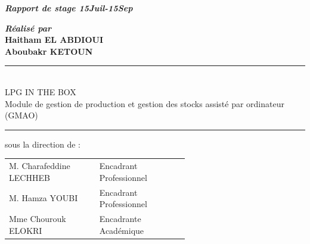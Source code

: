 \documentclass[a4paper, oneside, 12pt, final]{extreport}
\newcommand{\reportTitle} {%
  \textsc{Projet de EMSI IT SUMMER COMPETION 2024}
}
\newcommand{\reportAuthor} {%
  Haitham \textsc{EL ABDIOUI}\\
  Aboubakr \textsc{KETOUN}%
}
\newcommand{\reportSubject} {%
  \textsc{LPG IN THE BOX} \\ 
  Module de gestion de production et gestion des stocks assisté par ordinateur (GMAO)%
}
\newcommand{\dateSoutenance} {%
  2024%
}
\newcommand{\juryMemberOne} {%
  M. Charafeddine \textsc{LECHHEB}%
}
\newcommand{\juryMemberOneDesc} {%
  Encadrant Professionnel
}
\newcommand{\juryMemberTwo} {%
  M. Hamza \textsc{YOUBI}%
}
\newcommand{\juryMemberTwoDesc} {%
  Encadrant Professionnel
}
\newcommand{\juryMemberThree} {%
	Mme Chourouk \textsc{ELOKRI}%
}
\newcommand{\juryMemberThreeDesc} {%
	Encadrante Académique
}
\begin{document}
\begin{titlepage}
\begin{center}

\vspace{30pt} {%
  \renewcommand*{\familydefault}{\defaultFont}
  \fontsize{46pt}{46pt}\selectfont%
}

\vspace{10pt}
\textbf{\textit{Rapport de stage 15Juil-15Sep}}


\vspace{30pt}
\textbf{\textit{Réalisé par}}\\
\vspace{10pt} {%
  \fontsize{18pt}{18pt}\selectfont%
  \textbf{\reportAuthor}\\
}%

\vspace{10pt} {%
  \renewcommand*{\familydefault}{\defaultFont}
  \fontsize{27pt}{27pt}\selectfont%
  \rule{0.5\textwidth}{.4pt}\\
  \vspace{10pt}
  \reportSubject{}\\%
  \vspace{10pt}
  \rule{0.5\textwidth}{.4pt}
}


\vspace{10pt}
sous la direction de :\\
\vspace{20pt}

\vspace{10pt}
\begin{tabular}{p{0.3\linewidth} p{0.3\linewidth}}
  \juryMemberOne{} & \juryMemberOneDesc{}\\
  \juryMemberTwo{} & \juryMemberTwoDesc{}\\
 \juryMemberThree{} & \juryMemberThreeDesc{}\\
\end{tabular}


\end{center}
\end{titlepage}
\end{document}
